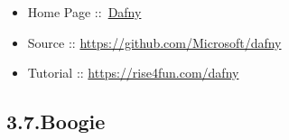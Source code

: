 \documentclass[12pt,twoside]{article}
\begin{document}
\begin{itemize}[noitemsep,topsep=\mdcompacttopsep]%

\item{}Home Page ::~\href{https://www.microsoft.com/en-us/research/project/dafny-a-language-and-program-verifier-for-functional-correctness}{Dafny}%

\item{}Source :: \href{https://github.com/Microsoft/dafny}{{\ttfamily https://\hspace{0pt}github.\hspace{0pt}com/\hspace{0pt}Microsoft/\hspace{0pt}dafny}}%

\item{}Tutorial :: \href{https://rise4fun.com/dafny}{{\ttfamily https://\hspace{0pt}rise4fun.\hspace{0pt}com/\hspace{0pt}dafny}}%
\end{itemize}%

\subsection{3.7.\hspace*{0.5em}Boogie}\label{sec-boogie}%
\end{document}

